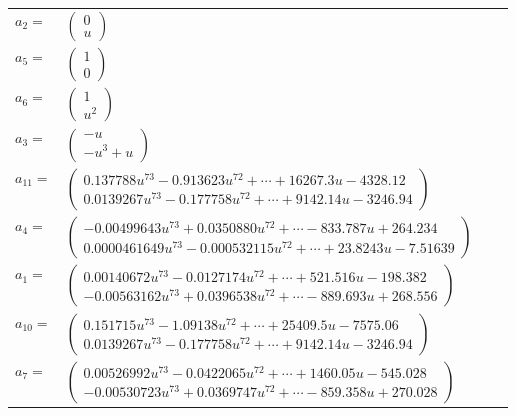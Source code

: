 \documentclass[1p]{elsarticle_modified}
\theoremstyle{definition}
\begin{document}
\begin{tabular}{m{7pt} m{180pt} m{7pt} m{180pt} }
\flushright $a_{2}=$&$\begin{pmatrix}0\\u\end{pmatrix}$ \\
\flushright $a_{5}=$&$\begin{pmatrix}1\\0\end{pmatrix}$ \\
\flushright $a_{6}=$&$\begin{pmatrix}1\\u^2\end{pmatrix}$ \\
\flushright $a_{3}=$&$\begin{pmatrix}- u\\- u^3+u\end{pmatrix}$ \\
\flushright $a_{11}=$&$\begin{pmatrix}0.137788 u^{73}-0.913623 u^{72}+\cdots+16267.3 u-4328.12\\0.0139267 u^{73}-0.177758 u^{72}+\cdots+9142.14 u-3246.94\end{pmatrix}$ \\
\flushright $a_{4}=$&$\begin{pmatrix}-0.00499643 u^{73}+0.0350880 u^{72}+\cdots-833.787 u+264.234\\0.0000461649 u^{73}-0.000532115 u^{72}+\cdots+23.8243 u-7.51639\end{pmatrix}$ \\
\flushright $a_{1}=$&$\begin{pmatrix}0.00140672 u^{73}-0.0127174 u^{72}+\cdots+521.516 u-198.382\\-0.00563162 u^{73}+0.0396538 u^{72}+\cdots-889.693 u+268.556\end{pmatrix}$ \\
\flushright $a_{10}=$&$\begin{pmatrix}0.151715 u^{73}-1.09138 u^{72}+\cdots+25409.5 u-7575.06\\0.0139267 u^{73}-0.177758 u^{72}+\cdots+9142.14 u-3246.94\end{pmatrix}$ \\
\flushright $a_{7}=$&$\begin{pmatrix}0.00526992 u^{73}-0.0422065 u^{72}+\cdots+1460.05 u-545.028\\-0.00530723 u^{73}+0.0369747 u^{72}+\cdots-859.358 u+270.028\end{pmatrix}$ \\

\end{tabular}
\end{document}
